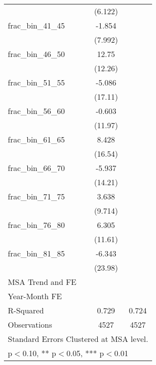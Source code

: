 \begin{table}[htbp]
\begin{tabular}{l*{2}{c}}
                    &     (6.122)         &                     \\
[1em]
frac\_bin\_41\_45      &      -1.854         &                     \\
                    &     (7.992)         &                     \\
[1em]
frac\_bin\_46\_50      &       12.75         &                     \\
                    &     (12.26)         &                     \\
[1em]
frac\_bin\_51\_55      &      -5.086         &                     \\
                    &     (17.11)         &                     \\
[1em]
frac\_bin\_56\_60      &      -0.603         &                     \\
                    &     (11.97)         &                     \\
[1em]
frac\_bin\_61\_65      &       8.428         &                     \\
                    &     (16.54)         &                     \\
[1em]
frac\_bin\_66\_70      &      -5.937         &                     \\
                    &     (14.21)         &                     \\
[1em]
frac\_bin\_71\_75      &       3.638         &                     \\
                    &     (9.714)         &                     \\
[1em]
frac\_bin\_76\_80      &       6.305         &                     \\
                    &     (11.61)         &                     \\
[1em]
frac\_bin\_81\_85      &      -6.343         &                     \\
                    &     (23.98)         &                     \\
\hline
MSA Trend and FE    &                     &                     \\
Year-Month FE       &                     &                     \\
R-Squared           &       0.729         &       0.724         \\
Observations        &        4527         &        4527         \\
\hline\hline
\multicolumn{3}{l}{\footnotesize Standard Errors Clustered at MSA level.}\\
\multicolumn{3}{l}{\footnotesize * p$<$0.10, ** p$<$0.05, *** p$<$0.01}\\
\end{tabular}
\end{table}
